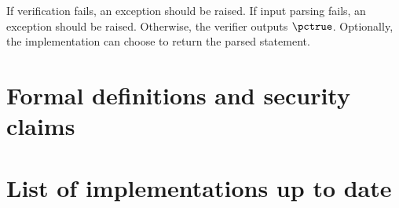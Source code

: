 \documentclass[runningheads,11pt]{article}
\begin{document}
If verification fails, an exception should be raised.
If input parsing fails, an exception should be raised.
Otherwise, the verifier outputs $\pctrue$. Optionally, the implementation can choose to return the parsed statement.





%

\appendix
\section{Formal definitions and security claims}
\section{List of implementations up to date}
\end{document}
